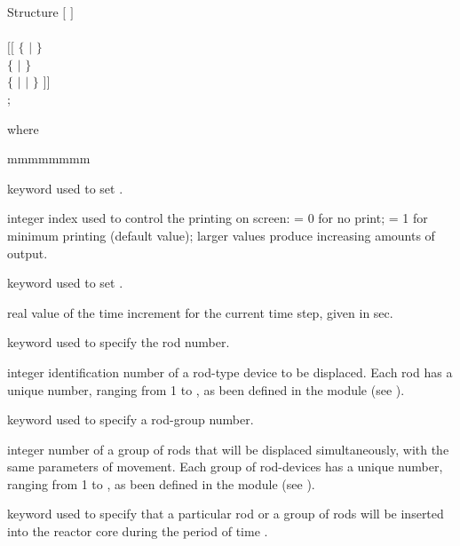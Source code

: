 \begin{DataStructure}{Structure }
$[$   $]$\\
  \\
$[[$ $\{$   $|$
  $\}$ \\
$\{$  $|$  $\}$ \\
$\{$   $|$
  $|$
  $\}$ $]]$  \\
;
\end{DataStructure}

\noindent where
\begin{ListeDeDescription}{mmmmmmmm}

\item[\moc{EDIT}] keyword used to set .

\item[\dusa{iprint}] integer index used to control the printing on
screen: = 0 for no print; = 1 for minimum printing (default value);
larger values produce increasing amounts of output.

\item[\moc{DELT}] keyword used to set .

\item[\dusa{delt}] real value of the time increment for the current
time step, given in sec.

\item[\moc{ROD}] keyword used to specify the rod  number.

\item[\dusa{id}] integer identification number of a rod-type device to be
displaced. Each rod has a unique  number, ranging from 1 to
, as been defined in the  module (see ).

\item[\moc{GROUP}] keyword used to specify a rod-group  number.

\item[\dusa{igrp}] integer number of a group of rods that will be displaced
simultaneously, with the same parameters of movement. Each group of
rod-devices has a unique  number, ranging from 1 to ,
as been defined in the  module (see ).

\item[\moc{INSR}] keyword used to specify that a particular rod or a
group of rods will be inserted into the reactor core during the period
of time .


\end{ListeDeDescription}
